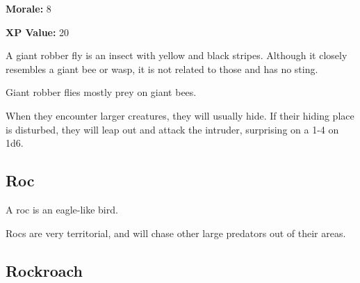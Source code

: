 \begin{multicols*}{2}
{\textbf{Morale:} 8

\textbf{XP Value:} 20}

A giant robber fly is an insect with yellow and black stripes. Although it closely resembles a giant bee or wasp, it is not related to those and has no sting.

Giant robber flies mostly prey on giant bees.

When they encounter larger creatures, they will usually hide. If their hiding place is disturbed, they will leap out and attack the intruder, surprising on a 1-4 on 1d6.

\subsection{Roc}

A roc is an eagle-like bird.

Rocs are very territorial, and will chase other large predators out of their areas.

\subsection{Rockroach}

\end{multicols*}
